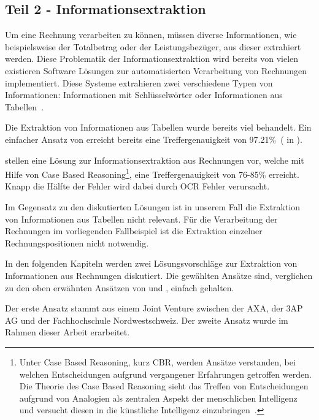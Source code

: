 \subsection{Teil 2 - Informationsextraktion}
\label{chap:ie}



Um eine Rechnung verarbeiten zu können, müssen diverse Informationen, wie beispielsweise der Totalbetrag oder der Leistungsbezüger, aus dieser extrahiert werden. Diese Problematik der Informationsextraktion wird bereits von vielen existieren Software Lösungen zur automatisierten Verarbeitung von Rechnungen implementiert. Diese Systeme extrahieren zwei verschiedene Typen von Informationen: Informationen mit Schlüsselwörter oder Informationen aus Tabellen~\autocite{Hamza}.

Die Extraktion von Informationen aus Tabellen wurde bereits viel behandelt. Ein einfacher Ansatz von \textcite{Mandal} erreicht bereits eine Treffergenauigkeit von 97.21\%~(\cite{Mandal} in \cite{Hamza}).

\textcite{Hamza} stellen eine Lösung zur Informationsextraktion aus Rechnungen vor, welche mit Hilfe von Case Based Reasoning\footnote{Unter Case Based Reasoning, kurz CBR, werden Ansätze verstanden, bei welchen Entscheidungen aufgrund vergangener Erfahrungen getroffen werden. Die Theorie des Case Based Reasoning sieht das Treffen von Entscheidungen aufgrund von Analogien als zentralen Aspekt der menschlichen Intelligenz und versucht diesen in die künstliche Intelligenz einzubringen~\autocite{CBR}.}, eine Treffergenauigkeit von 76-85\% erreicht. Knapp die Hälfte der Fehler wird dabei durch OCR Fehler verursacht.

Im Gegensatz zu den diskutierten Lösungen ist in unserem Fall die Extraktion von Informationen aus Tabellen nicht relevant. Für die Verarbeitung der Rechnungen im vorliegenden Fallbeispiel ist die Extraktion einzelner Rechnungspositionen nicht notwendig.

In den folgenden Kapiteln werden zwei Lösungsvorschläge zur Extraktion von Informationen aus Rechnungen diskutiert. Die gewählten Ansätze sind, verglichen zu den oben erwähnten Ansätzen von \textcite{Mandal} und \textcite{Hamza}, einfach gehalten. 

Der erste Ansatz stammt aus einem Joint Venture zwischen der AXA, der 3AP AG und der Fachhochschule Nordwestschweiz. Der zweite Ansatz wurde im Rahmen dieser Arbeit erarbeitet.


